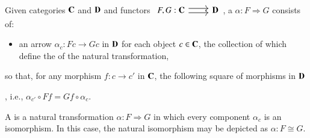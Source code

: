\documentclass[12pt, a4paper, oneside, openright, titlepage]{book}
\begin{document}
\begin{defn}
    Given categories $\normalfont\textbf{C}$ and $\normalfont\textbf{D}$ and functors $\begin{tikzcd} {F,G:\textbf{C}} & {\textbf{D}} \arrow[shift right=1, from=1-1, to=1-2] \arrow[shift left=1, from=1-1, to=1-2] \end{tikzcd}$, a  $\alpha:F\Rightarrow G$ consists of: \begin{itemize}
        \item an arrow $\alpha_c:Fc\rightarrow Gc$ in $\normalfont\textbf{D}$ for each object $c \in \normalfont\textbf{C}$, the collection of which define the  of the natural transformation,
    \end{itemize}
    so that, for any morphism $f:c\rightarrow c'$ in $\normalfont\textbf{C}$, the following square of morphisms in $\normalfont\textbf{D}$ 
    \begin{center}
    \end{center}
    , i.e., $\alpha_{c'}\circ Ff = Gf \circ \alpha_c$.


    A  is a natural transformation $\alpha:F\Rightarrow G$ in which every component $\alpha_c$ is an isomorphism. In this case, the natural isomorphism may be depicted as $\alpha:F\cong G$.
\end{defn}
\end{document}
